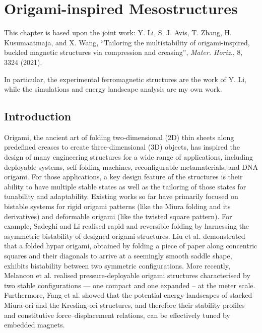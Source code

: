 \chapter{Origami-inspired Mesostructures}
\label{ch:origami_ribbon}
\graphicspath{{origami_ribbon/fig/}}

This chapter is based upon the joint work: Y. Li, S. J. Avis, T. Zhang, H. Kusumaatmaja, and X. Wang, ``Tailoring the multistability of origami-inspired, buckled magnetic structures via compression and creasing'', \emph{Mater. Horiz.}, 8, 3324 (2021).

In particular, the experimental ferromagnetic structures are the work of Y. Li, while the simulations and energy landscape analysis are my own work.



\section{Introduction}

Origami, the ancient art of folding two-dimensional (2D) thin sheets along predefined creases to create three-dimensional (3D) objects\cite{Chen2015,Dudte2016,Ning2018}, has inspired the design of many engineering structures for a wide range of applications, including deployable systems\cite{Thesiya2015,Melancon2021,Liu2020}, self-folding machines\cite{Felton2014}, reconfigurable metamaterials\cite{Silverberg2014,Chen2021,Yang2019}, and DNA origami\cite{Hellmeier2021}.
For those applications, a key design feature of the structures is their ability to have multiple stable states as well as the tailoring of those states for tunability and adaptability.
Existing works so far have primarily focused on bistable systems for rigid origami patterns (like the Miura folding\cite{Miura1985} and its derivatives\cite{Filipov2015}) and deformable origami (like the twisted square pattern\cite{Silverberg2015}).
For example, Sadeghi and Li realised rapid and reversible folding by harnessing the asymmetric bistability of designed origami structures\cite{Sadeghi2020}.
Liu et al. demonstrated that a folded hypar origami, obtained by folding a piece of paper along concentric squares and their diagonals to arrive at a seemingly smooth saddle shape, exhibits bistability between two symmetric configurations\cite{Liu2019b}.
More recently, Melancon et al. realised pressure-deployable origami structures characterised by two stable configurations — one compact and one expanded – at the meter scale\cite{Melancon2021}.
Furthermore, Fang et al. showed that the potential energy landscapes of stacked Miura-ori and the Kresling-ori structures, and therefore their stability profiles and constitutive force–displacement relations, can be effectively tuned by embedded magnets\cite{Fang2019}.

